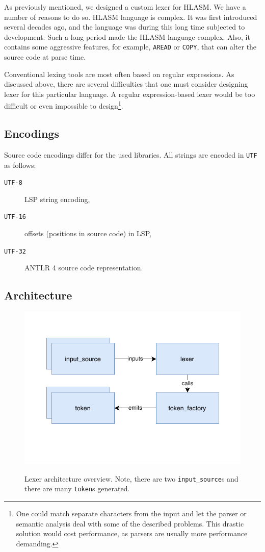 As previously mentioned, we designed a custom lexer for HLASM. We have a number of reasons to do so. HLASM language is complex. It was first introduced several decades ago, and the language was during this long time subjected to development. Such a long period made the HLASM language complex. Also, it contains some aggressive features, for example, \texttt{AREAD} or \texttt{COPY}, that can alter the source code at parse time.

Conventional lexing tools are most often based on regular expressions. As discussed above, there are several difficulties that one must consider designing lexer for this particular language. A regular expression-based lexer would be too difficult or even impossible to design\footnote{One could match separate characters from the input and let the parser or semantic analysis deal with some of the described problems. This drastic solution would cost performance, as parsers are usually more performance demanding.}.

\subsection{Encodings}
Source code encodings differ for the used libraries. All strings are encoded in \texttt{UTF} as follows:

\begin{description}
	\item[\texttt{UTF-8}] LSP string encoding,
	\item[\texttt{UTF-16}] offsets (positions in source code) in LSP,
	\item[\texttt{UTF-32}] ANTLR 4 source code representation.
\end{description}

\subsection{Architecture}

\begin{figure}[H]
	\centering
	\includegraphics{img/lexer_arch}
	\label{lexer_arch}
	\caption{Lexer architecture overview. Note, there are two \texttt{input\_source}s and there are many \texttt{token}s generated.}
\end{figure}

